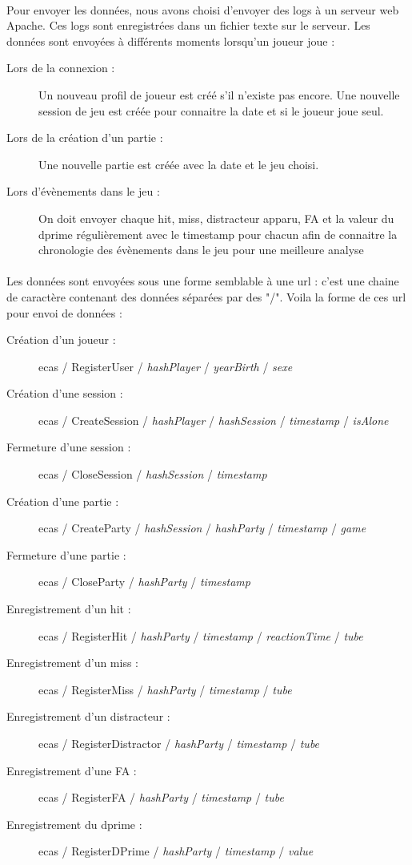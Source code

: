 \paragraph{}Pour envoyer les données, nous avons choisi d'envoyer des logs à un serveur web Apache. Ces logs sont enregistrées dans un fichier texte sur
le serveur. Les données sont envoyées à différents moments lorsqu'un joueur joue :
\begin{description}
\item[Lors de la connexion :] Un nouveau profil de joueur est créé s'il n'existe pas encore. Une nouvelle session de jeu est créée pour connaitre la date et si le joueur joue seul.
\item[Lors de la création d'un partie :] Une nouvelle partie est créée avec la date et le jeu choisi.
\item[Lors d'évènements dans le jeu :] On doit envoyer chaque hit, miss, distracteur apparu, FA et la valeur du dprime régulièrement avec le timestamp pour chacun afin de connaitre la
chronologie des évènements dans le jeu pour une meilleure analyse
\end{description}

\paragraph{}Les données sont envoyées sous une forme semblable à une url : c'est une chaine de caractère contenant des données séparées par des "/". Voila la forme de ces url pour
envoi de données :
\begin{description}
    \item[Création d'un joueur :] ecas / RegisterUser / \textit{hashPlayer} / \textit{yearBirth} / \textit{sexe}
    \item[Création d'une session :] ecas / CreateSession / \textit{hashPlayer} / \textit{hashSession} / \textit{timestamp} / \textit{isAlone}
    \item[Fermeture d'une session :] ecas / CloseSession / \textit{hashSession} / \textit{timestamp}
    \item[Création d'une partie :] ecas / CreateParty / \textit{hashSession} / \textit{hashParty} / \textit{timestamp} / \textit{game}
    \item[Fermeture d'une partie :] ecas / CloseParty / \textit{hashParty} / \textit{timestamp}
    \item[Enregistrement d'un hit :] ecas / RegisterHit / \textit{hashParty} / \textit{timestamp} / \textit{reactionTime} / \textit{tube}
    \item[Enregistrement d'un miss :] ecas / RegisterMiss / \textit{hashParty} / \textit{timestamp} / \textit{tube}
    \item[Enregistrement d'un distracteur :] ecas / RegisterDistractor / \textit{hashParty} / \textit{timestamp} / \textit{tube}
    \item[Enregistrement d'une FA :] ecas / RegisterFA / \textit{hashParty} / \textit{timestamp} / \textit{tube}
    \item[Enregistrement du dprime :] ecas / RegisterDPrime / \textit{hashParty} / \textit{timestamp} / \textit{value}
\end{description}

